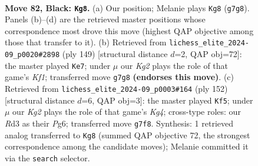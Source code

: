\documentclass[11pt]{article}
\begin{document}
\begin{figure}[p]\centering
\begin{subfigure}{0.46\textwidth}\centering
\resizebox{\linewidth}{!}{%
\newchessgame
\chessboard[
  setfen={8/1R4k1/8/6K1/r6P/3r4/8/8 b - - 6 82},
  showmover=false,
  pgfstyle=straightmove, color=movearrow, markmove={g7-g8}
]}
\caption{}
\end{subfigure}\hfill
\begin{subfigure}{0.46\textwidth}\centering
\resizebox{\linewidth}{!}{%
\newchessgame
\chessboard[
  setfen={R4k2/8/6K1/5P2/8/8/8/5r2 b - - 2 75},
  showmover=false,
  pgfstyle=straightmove, color=movearrow, markmove={f8-e7}
]}
\caption{}
\end{subfigure}
\\[4pt]
\begin{subfigure}{0.46\textwidth}\centering
\resizebox{\linewidth}{!}{%
\newchessgame
\chessboard[
  setfen={8/8/1r4P1/4R3/6K1/8/4p3/5k2 w - - 1 77},
  showmover=false,
  pgfstyle=straightmove, color=movearrow, markmove={g4-f5}
]}
\caption{}
\end{subfigure}\hfill

\caption{\textbf{Move 82, Black: \texttt{Kg8}.} (a) Our position; Melanie plays \texttt{Kg8} (\texttt{g7g8}). Panels (b)--(d) are the retrieved master positions whose correspondence most drove this move (highest QAP objective among those that transfer to it). (b) Retrieved from \texttt{lichess\_elite\_2024-09\_p0020\#2898} (ply 149) [structural distance $d$=2, QAP obj=72]: the master played \texttt{Ke7}; under $\mu$ our \emph{Kg2} plays the role of that game's \emph{Kf1}; transferred move \texttt{g7g8} \textbf{(endorses this move)}. (c) Retrieved from \texttt{lichess\_elite\_2024-09\_p0003\#164} (ply 152) [structural distance $d$=6, QAP obj=3]: the master played \texttt{Kf5}; under $\mu$ our \emph{Kg2} plays the role of that game's \emph{Kg4}; cross-type roles: our \emph{R}d3 as their \emph{P}g6; transferred move \texttt{g7f8}. Synthesis: 1 retrieved analog transferred to \texttt{Kg8} (summed QAP objective 72, the strongest correspondence among the candidate moves); Melanie committed it via the \texttt{search} selector.}
\label{fig:thought-m163}
\end{figure}

\clearpage
\end{document}
